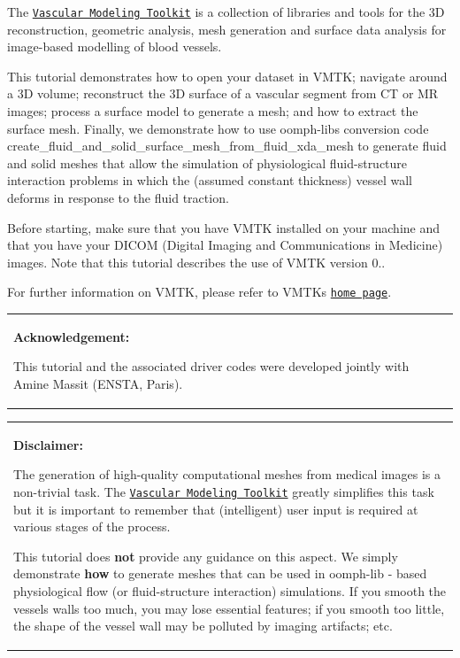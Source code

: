 The \href{http://www.vmtk.org}{\tt Vascular Modeling Toolkit} is a collection of libraries and tools for the 3D reconstruction, geometric analysis, mesh generation and surface data analysis for image-\/based modelling of blood vessels.

This tutorial demonstrates how to open your dataset in V\+M\+TK; navigate around a 3D volume; reconstruct the 3D surface of a vascular segment from CT or MR images; process a surface model to generate a mesh; and how to extract the surface mesh. Finally, we demonstrate how to use {\ttfamily oomph-\/lib\textquotesingle{}s} conversion code {\ttfamily create\+\_\+fluid\+\_\+and\+\_\+solid\+\_\+surface\+\_\+mesh\+\_\+from\+\_\+fluid\+\_\+xda\+\_\+mesh} to generate fluid and solid meshes that allow the simulation of physiological fluid-\/structure interaction problems in which the (assumed constant thickness) vessel wall deforms in response to the fluid traction.

Before starting, make sure that you have V\+M\+TK installed on your machine and that you have your D\+I\+C\+OM (Digital Imaging and Communications in Medicine) images. Note that this tutorial describes the use of V\+M\+TK version 0..

For further information on V\+M\+TK, please refer to V\+M\+TK\textquotesingle{}s \href{http://www.vmtk.org}{\tt home page}.

\begin{center} \tabulinesep=1mm
\begin{longtabu} spread 0pt [c]{*{1}{|X[-1]}|}
\hline
\begin{center} {\bfseries Acknowledgement\+:} \end{center}  This tutorial and the associated driver codes were developed jointly with Amine Massit (E\+N\+S\+TA, Paris).   \\
\end{longtabu}
\end{center} 

\begin{center} \tabulinesep=1mm
\begin{longtabu} spread 0pt [c]{*{1}{|X[-1]}|}
\hline
\begin{center} {\bfseries Disclaimer\+:} \end{center}  The generation of high-\/quality computational meshes from medical images is a non-\/trivial task. The \href{http://www.vmtk.org}{\tt Vascular Modeling Toolkit} greatly simplifies this task but it is important to remember that (intelligent) user input is required at various stages of the process.

This tutorial does {\bfseries not} provide any guidance on this aspect. We simply demonstrate {\bfseries how} to generate meshes that can be used in {\ttfamily oomph-\/lib} -\/ based physiological flow (or fluid-\/structure interaction) simulations. If you smooth the vessels walls too much, you may lose essential features; if you smooth too little, the shape of the vessel wall may be polluted by imaging artifacts; etc.   \\
\end{longtabu}
\end{center} 




